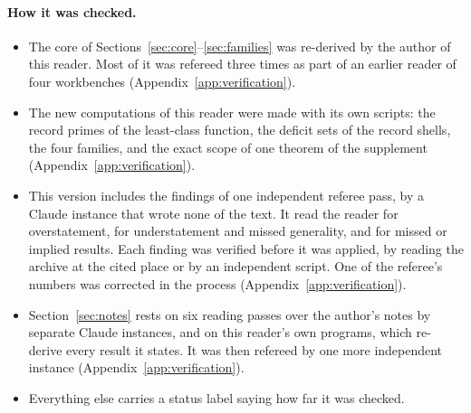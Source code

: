 \paragraph{How it was checked.}
\begin{itemize}
\item The core of Sections~\ref{sec:core}--\ref{sec:families} was re-derived by the author of this reader. Most of it was refereed three times as part of an earlier reader of four workbenches \cite{WorkbenchReader} (Appendix~\ref{app:verification}).
\item The new computations of this reader were made with its own scripts: the record primes of the least-class function, the deficit sets of the record shells, the four families, and the exact scope of one theorem of the supplement (Appendix~\ref{app:verification}).
\item This version includes the findings of one independent referee pass, by a Claude instance that wrote none of the text. It read the reader for overstatement, for understatement and missed generality, and for missed or implied results. Each finding was verified before it was applied, by reading the archive at the cited place or by an independent script. One of the referee's numbers was corrected in the process (Appendix~\ref{app:verification}).
\item Section~\ref{sec:notes} rests on six reading passes over the author's notes by separate Claude instances, and on this reader's own programs, which re-derive every result it states. It was then refereed by one more independent instance (Appendix~\ref{app:verification}).
\item Everything else carries a status label saying how far it was checked.
\end{itemize}

